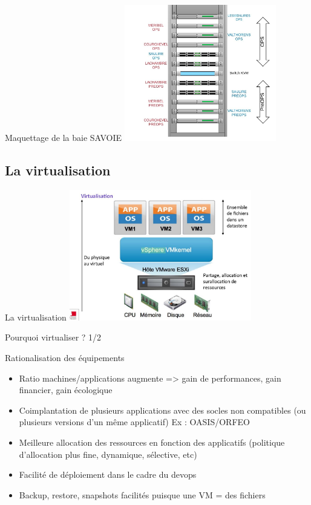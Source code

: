 \documentclass[10pt]{beamer}
\begin{document}
\begin{center}
\begin{frame}{Maquettage de la baie SAVOIE}
\includegraphics[width=250px]{Schemas/Maquettage_Savoie.jpg}
\end{frame}
\end{center}

\subsection{La virtualisation}

\begin{center}
\begin{frame}{La virtualisation}
\includegraphics[width=300px]{Schemas/Virtua.jpg}
\end{frame}
\end{center}

\begin{frame}{Pourquoi virtualiser ? 1/2}
    \begin{block} {Rationalisation des équipements}
        \begin{itemize}
            \item Ratio machines/applications augmente => gain de performances, gain financier, gain écologique \pause
            \item Coimplantation de plusieurs applications avec des socles non compatibles (ou plusieurs versions d’un même applicatif) Ex : OASIS/ORFEO \pause
            \item Meilleure allocation des ressources en fonction des applicatifs (politique d'allocation plus fine, dynamique, sélective, etc) \pause
            \item Facilité de déploiement dans le cadre du devops \pause
            \item Backup, restore, snapshots facilités puisque une VM = des fichiers \pause
        \end{itemize}
    \end{block}
\end{frame}
        
\end{document}
